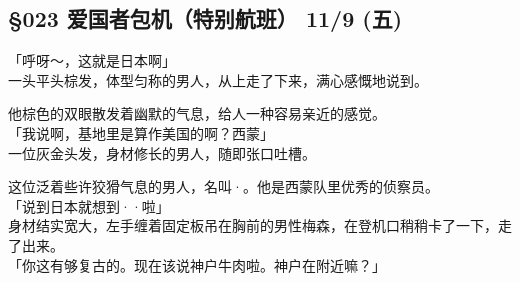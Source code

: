 \subsection{§023 爱国者包机（特别航班） 11/9 (五)}

「呼呀～，这就是日本啊」\\

一头平头棕发，体型匀称的男人，从上走了下来，满心感慨地说到。

他棕色的双眼散发着幽默的气息，给人一种容易亲近的感觉。\\

「我说啊，基地里是算作美国的啊？西蒙」\\

一位灰金头发，身材修长的男人，随即张口吐槽。

这位泛着些许狡猾气息的男人，名叫·。他是西蒙队里优秀的侦察员。\\

「说到日本就想到··啦」\\

身材结实宽大，左手缠着固定板吊在胸前的男性梅森，在登机口稍稍卡了一下，走了出来。\\

「你这有够复古的。现在该说神户牛肉啦。神户在附近嘛？」\\


